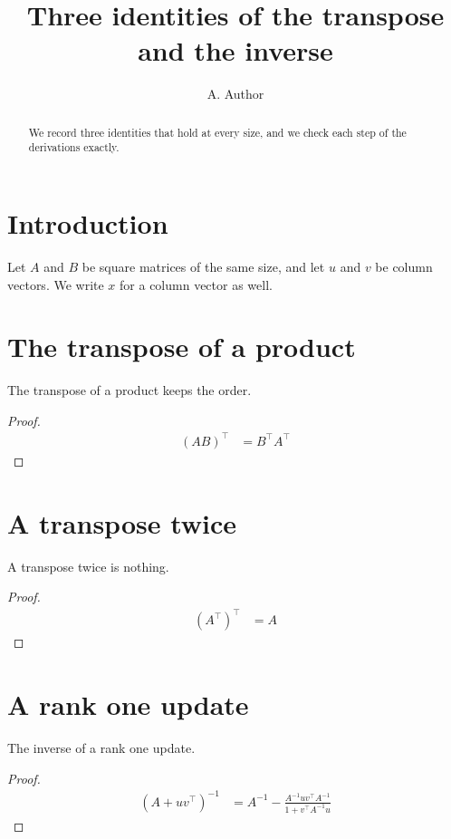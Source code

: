 \documentclass{article}
\title{Three identities of the transpose and the inverse}
\author{A. Author}
\begin{document}
\begin{abstract}
We record three identities that hold at every size, and we check each step
of the derivations exactly.
\end{abstract}

\section{Introduction}
Let $A$ and $B$ be square matrices of the same size, and let $u$ and $v$ be
column vectors. We write $x$ for a column vector as well.

\section{The transpose of a product}
\begin{theorem}
The transpose of a product keeps the order.
\end{theorem}
\begin{proof}
\begin{align*}
(A B)^\top &= B^\top A^\top
\end{align*}
\end{proof}

\section{A transpose twice}
\begin{theorem}
A transpose twice is nothing.
\end{theorem}
\begin{proof}
\begin{align*}
(A^\top)^\top &= A
\end{align*}
\end{proof}

\section{A rank one update}
\begin{theorem}
The inverse of a rank one update.
\end{theorem}
\begin{proof}
\begin{align*}
(A + u v^\top)^{-1} &= A^{-1} - \frac{A^{-1} u v^\top A^{-1}}{1 + v^\top A^{-1} u}
\end{align*}
\end{proof}
\end{document}
